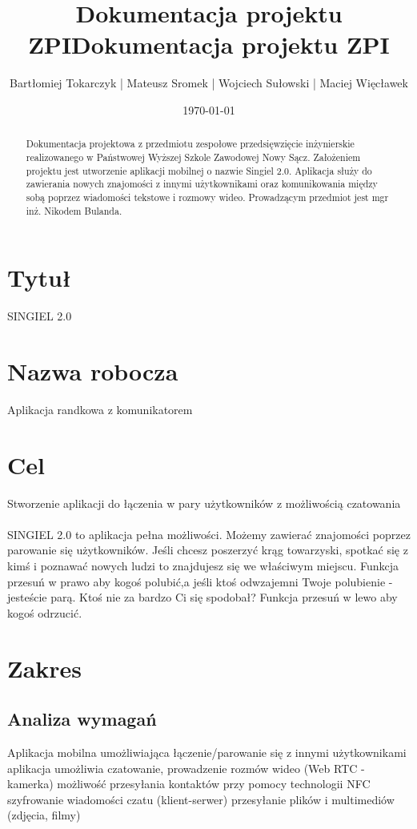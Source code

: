 \documentclass[12pt,a4paper]{article}
\title{Dokumentacja projektu ZPI}
\begin{document}
\title{Dokumentacja projektu ZPI}
\author{Bartłomiej Tokarczyk |
Mateusz Sromek |
Wojciech Sułowski |
Maciej Więcławek}
\date{\today}

\maketitle
\begin{abstract}
Dokumentacja projektowa z przedmiotu zespołowe przedsięwzięcie inżynierskie realizowanego w Państwowej Wyższej Szkole Zawodowej Nowy Sącz. Założeniem projektu jest utworzenie aplikacji mobilnej o nazwie Singiel 2.0. Aplikacja służy do zawierania nowych znajomości z innymi użytkownikami oraz  komunikowania między sobą poprzez wiadomości tekstowe i rozmowy wideo. Prowadzącym przedmiot jest mgr inż. Nikodem Bulanda.
\end{abstract}
\newpage

\tableofcontents
\listoftables
\listoffigures

\newpage

\section{Tytuł}
SINGIEL 2.0
\section{Nazwa robocza}
Aplikacja randkowa z komunikatorem
\section{Cel}
Stworzenie aplikacji do łączenia w pary użytkowników z możliwością czatowania
\\
\\
SINGIEL 2.0 to aplikacja pełna możliwości. Możemy zawierać znajomości poprzez parowanie się użytkowników. Jeśli chcesz poszerzyć krąg towarzyski, spotkać się z kimś i poznawać nowych ludzi to znajdujesz się we właściwym miejscu. Funkcja przesuń w prawo aby kogoś polubić,a jeśli ktoś odwzajemni Twoje polubienie - jesteście parą. Ktoś nie za bardzo Ci się spodobał? Funkcja przesuń w lewo aby kogoś odrzucić.
\section{Zakres}
\subsection{Analiza wymagań}
\hspace{10mm}Aplikacja mobilna umożliwiająca łączenie/parowanie się z innymi użytkownikami 
aplikacja umożliwia czatowanie, prowadzenie rozmów wideo (Web RTC - kamerka)
możliwość przesyłania kontaktów przy pomocy technologii NFC
szyfrowanie wiadomości czatu (klient-serwer)
przesyłanie plików i multimediów (zdjęcia, filmy)
\end{document}
